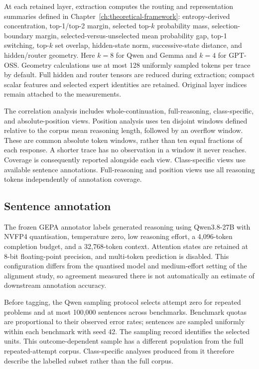 \documentclass[12pt,a4paper,twoside,openright]{book}
\begin{document}
At each retained layer, extraction computes the routing and representation
summaries defined in Chapter~\ref{ch:theoretical-framework}: entropy-derived
concentration, top-1/top-2 margin, selected top-$k$ probability mass,
selection-boundary margin, selected-versus-unselected mean probability gap,
top-1 switching, top-$k$ set overlap, hidden-state norm, successive-state
distance, and hidden/router geometry. Here $k=8$ for Qwen and Gemma and
$k=4$ for GPT-OSS. Geometry calculations use at most
128 uniformly sampled tokens per trace by default. Full hidden and router
tensors are reduced during extraction; compact scalar features and selected
expert identities are retained. Original layer indices remain attached to the
measurements.

The correlation analysis includes whole-continuation, full-reasoning,
class-specific, and absolute-position views. Position analysis uses ten disjoint windows
defined relative to the corpus mean reasoning length, followed by an overflow
window. These are common absolute token windows, rather than ten equal
fractions of each response. A shorter trace has no observation in a window
it never reaches. Coverage is consequently reported alongside each view.
Class-specific views use available sentence annotations. Full-reasoning
and position views use all reasoning tokens independently of annotation
coverage.

\subsection{Sentence annotation}

The frozen GEPA annotator labels generated reasoning using Qwen3.8-27B
with NVFP4 quantisation, temperature zero, low reasoning effort,
a 4,096-token completion budget, and a 32,768-token context. Attention
states are retained at 8-bit floating-point precision, and multi-token
prediction is disabled. This configuration differs from the quantised model
and medium-effort
setting of the alignment study, so agreement measured there is not
automatically an estimate of downstream annotation accuracy.

Before tagging, the Qwen sampling protocol selects attempt zero for repeated
problems and at most 100,000 sentences across benchmarks. Benchmark quotas
are proportional to their observed error rates; sentences are sampled
uniformly within each benchmark with seed 42. The sampling record identifies
the selected units. This outcome-dependent sample has a different population
from the full repeated-attempt corpus. Class-specific analyses produced from
it therefore describe the labelled subset rather than the full corpus.
\end{document}
